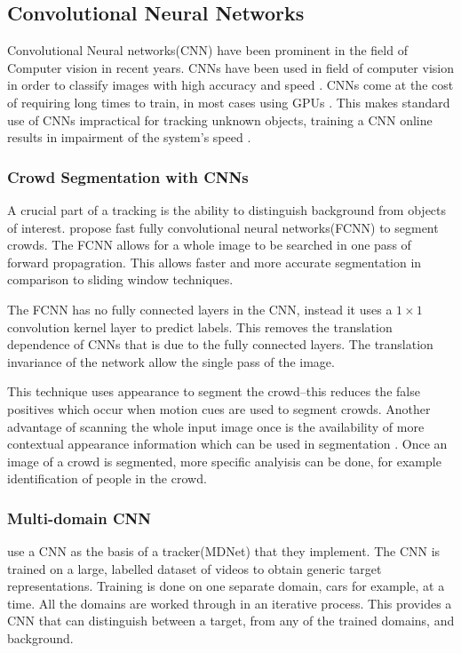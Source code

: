 \subsection{Convolutional Neural Networks}
  Convolutional Neural networks(CNN) have been prominent in the field of Computer vision in recent years.
  CNNs have been used in field of computer vision in order to classify images with high accuracy and speed \cite{razavian2014}.
  CNNs come at the cost of requiring long times to train, in most cases using GPUs \cite{krizhevsky2012}.
  This makes standard use of CNNs impractical for tracking unknown objects, training a CNN online results in impairment of the system's speed \cite{bertinetto2016}.

  \subsubsection{Crowd Segmentation with CNNs}
  A crucial part of a tracking is the ability to distinguish background from objects of interest.
  \citeauthor{kang2014} \cite{kang2014} propose fast fully convolutional neural networks(FCNN) to segment crowds.
  The FCNN allows for a whole image to be searched in one pass of forward propagration.
  This allows faster and more accurate segmentation in comparison to sliding window techniques.

  The FCNN has no fully connected layers in the CNN, instead it uses a $1 \times 1$ convolution kernel layer to predict labels.
  This removes the translation dependence of CNNs that is due to the fully connected layers.
  The translation invariance of the network allow the single pass of the image.

  This technique uses appearance to segment the crowd--this reduces the false positives which occur when motion cues are used to segment crowds.
  Another advantage of scanning the whole input image once is the availability of more contextual appearance information which can be used in segmentation \cite{eigenFacesRecog, farabet2012}.
  Once an image of a crowd is segmented, more specific analyisis can be done, for example identification of people in the crowd.


  \subsubsection{Multi-domain CNN}
  \citeauthor{CNNTracking} \cite{CNNTracking} use a CNN as the basis of a tracker(MDNet) that they implement.
  The CNN is trained on a large, labelled dataset of videos to obtain generic target representations.
  Training is done on one separate domain, cars for example, at a time. 
  All the domains are worked through in an iterative process.
  This provides a CNN that can distinguish between a target, from any of the trained domains, and background.

